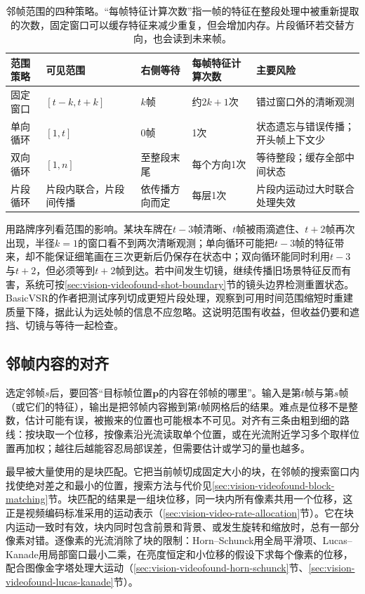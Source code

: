 \begin{table}[htbp]
  \centering
  \begin{tabularx}{\linewidth}{@{}lXXXX@{}}
    \toprule
    范围策略 & 可见范围 & 右侧等待 & 每帧特征计算次数 & 主要风险\\
    \midrule
    固定窗口 & $[t-k,t+k]$ & $k$帧 & 约$2k+1$次 & 错过窗口外的清晰观测\\
    单向循环 & $[1,t]$ & 0帧 & 1次 & 状态遗忘与错误传播；开头帧上下文少\\
    双向循环 & $[1,n]$ & 至整段末尾 & 每个方向1次 & 等待整段；缓存全部中间状态\\
    片段循环 & 片段内联合，片段间传播 & 依传播方向而定 & 每层1次 & 片段内运动过大时联合处理失效\\
    \bottomrule
  \end{tabularx}
  \caption{邻帧范围的四种策略。“每帧特征计算次数”指一帧的特征在整段处理中被重新提取的次数，固定窗口可以缓存特征来减少重复，但会增加内存。片段循环若交替方向，也会读到未来帧。}
  \label{tab:vision-video-range-strategies}
\end{table}

用路牌序列看范围的影响。某块车牌在$t-3$帧清晰、$t$帧被雨滴遮住、$t+2$帧再次出现，半径$k=1$的窗口看不到两次清晰观测；单向循环可能把$t-3$帧的特征带来，却不能保证细笔画在三次更新后仍保存在状态中；双向循环能同时利用$t-3$与$t+2$，但必须等到$t+2$帧到达。若中间发生切镜，继续传播旧场景特征反而有害，系统可按\ref{sec:vision-videofound-shot-boundary}节的镜头边界检测重置状态。BasicVSR的作者把测试序列切成更短片段处理，观察到可用时间范围缩短时重建质量下降，据此认为远处帧的信息不应忽略。这说明范围有收益，但收益仍要和遮挡、切镜与等待一起检查。

\subsection{邻帧内容的对齐}
\label{sec:vision-video-warping}

选定邻帧$s$后，要回答“目标帧位置$\bm{p}$的内容在邻帧的哪里”。输入是第$t$帧与第$s$帧（或它们的特征），输出是把邻帧内容搬到第$t$帧网格后的结果。难点是位移不是整数，估计可能有误，被搬来的位置也可能根本不可见。对齐有三条由粗到细的路线：按块取一个位移，按像素沿光流读取单个位置，或在光流附近学习多个取样位置再加权；越往后越能容忍局部误差，但需要估计或学习的量也越多。

最早被大量使用的是块匹配。它把当前帧切成固定大小的块，在邻帧的搜索窗口内找使绝对差之和最小的位置，搜索方法与代价见\ref{sec:vision-videofound-block-matching}节。块匹配的结果是一组块位移，同一块内所有像素共用一个位移，这正是视频编码标准采用的运动表示（\ref{sec:vision-video-rate-allocation}节）。它在块内运动一致时有效，块内同时包含前景和背景、或发生旋转和缩放时，总有一部分像素对错。逐像素的光流消除了块的限制：Horn--Schunck用全局平滑项、Lucas--Kanade用局部窗口最小二乘，在亮度恒定和小位移的假设下求每个像素的位移，配合图像金字塔处理大运动（\ref{sec:vision-videofound-horn-schunck}节、\ref{sec:vision-videofound-lucas-kanade}节）。

